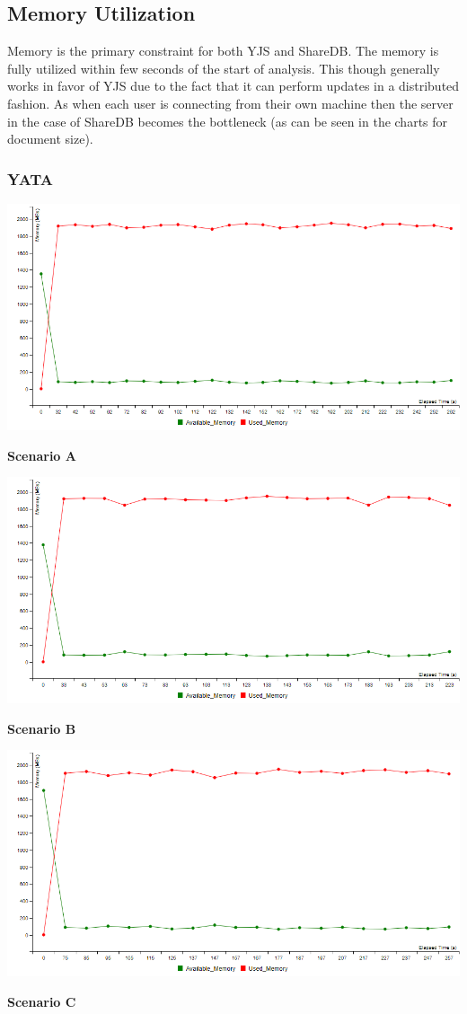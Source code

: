 \documentclass[12pt]{article}
\begin{document}
  \subsection{Memory Utilization}
  Memory is the primary constraint for both YJS and ShareDB. The memory is fully utilized within few seconds
  of the start of analysis. This though generally works in favor of YJS due to the fact that it can perform
  updates in a distributed fashion. As when each user is connecting from their own machine then the server
  in the case of ShareDB becomes the bottleneck (as can be seen in the charts for document size).
  \subsubsection{YATA}
  \begin{center}
    \includegraphics[scale=0.48]{yjs_memory_S1.png}

    \textbf{Scenario A}
    
    \includegraphics[scale=0.48]{yjs_memory_S2.png}
    
    \textbf{Scenario B}
    
    \includegraphics[scale=0.48]{yjs_memory_S3.png}
    
    \textbf{Scenario C}

  \end{center}
\end{document}
